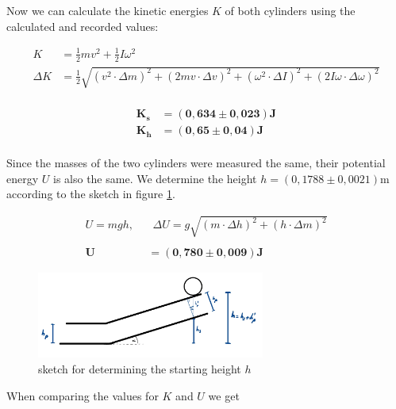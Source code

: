 \documentclass{article}
\begin{document}
Now we can calculate the kinetic energies $K$ of both cylinders using the calculated and recorded values:

\begin{equation}
    \begin{split}
        K &= \frac{1}{2} mv^2 + \frac{1}{2} I \omega^2 \\
        \Delta K &= \frac{1}{2} \sqrt{(v^2 \cdot \Delta m)^2 + (2mv \cdot \Delta v)^2 + (\omega^2 \cdot \Delta I)^2 + (2I \omega \cdot \Delta \omega)^2} \\
    \end{split}
\end{equation}

\begin{equation}
    \begin{split}
        \bm{K_s} &= \bm{(0,634 \pm 0,023)} \textbf{J} \\
        \bm{K_h} &= \bm{(0,65 \pm 0,04)} \textbf{J} \\        
    \end{split}
    \label{res:K}
\end{equation}

Since the masses of the two cylinders were measured the same, their potential energy $U$ is also the same. We determine the height $h = (0,1788 \pm 0,0021)$m according to the sketch in figure \ref{fig:sketchh}.

\begin{equation}
    \begin{split}
        U = mgh, \ \ & \ \ \Delta U = g \sqrt{(m \cdot \Delta h)^2 + (h \cdot \Delta m)^2} \\ \\
        \bm{U} &= \bm{(0,780 \pm 0,009)} \textbf{J}
    \end{split}
    \label{res:U}
\end{equation}

\begin{figure} [!ht]
    \centering
    \includegraphics[width=7.5cm]{graphics/sketch15.jpg}
    \caption{sketch for determining the starting height $h$}
    \label{fig:sketchh}
\end{figure}

When comparing the values for $K$ and $U$ we get
\end{document}
